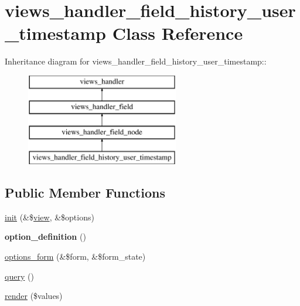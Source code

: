 \hypertarget{classviews__handler__field__history__user__timestamp}{
\section{views\_\-handler\_\-field\_\-history\_\-user\_\-timestamp Class Reference}
\label{classviews__handler__field__history__user__timestamp}
}
Inheritance diagram for views\_\-handler\_\-field\_\-history\_\-user\_\-timestamp::\begin{figure}[H]
\begin{center}
\leavevmode
\includegraphics[height=4cm]{classviews__handler__field__history__user__timestamp}
\end{center}
\end{figure}
\subsection*{Public Member Functions}
\begin{DoxyCompactItemize}
\item 
\hyperlink{classviews__handler__field__history__user__timestamp_addc2c91173eae704e1283e726c6f15d0}{init} (\&\$\hyperlink{classview}{view}, \&\$options)
\item 
\hypertarget{classviews__handler__field__history__user__timestamp_a2cedbce8f02c9c051606c89e6d349e6b}{
{\bfseries option\_\-definition} ()}
\label{classviews__handler__field__history__user__timestamp_a2cedbce8f02c9c051606c89e6d349e6b}

\item 
\hyperlink{classviews__handler__field__history__user__timestamp_a785f6784b015c681b25f58573b1e6859}{options\_\-form} (\&\$form, \&\$form\_\-state)
\item 
\hyperlink{classviews__handler__field__history__user__timestamp_abd6ff7a6d51f75781cf6ea6288612c07}{query} ()
\item 
\hyperlink{classviews__handler__field__history__user__timestamp_acc2398dad2662ab9d4faf0ea9daba116}{render} (\$values)
\end{DoxyCompactItemize}


